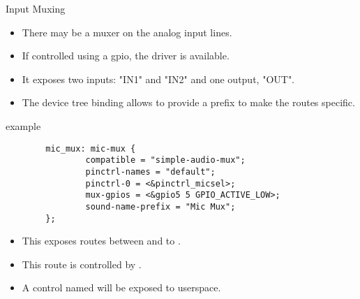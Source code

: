 \begin{frame}{Input Muxing}
  \begin{itemize}
  \item There may be a muxer on the analog input lines.
  \item If controlled using a gpio, the  driver is
    available.
  \item It exposes two inputs: "IN1" and "IN2" and one output, "OUT".
  \item The device tree binding allows to provide a prefix to make the
    routes specific.
  \end{itemize}
\end{frame}

\begin{frame}[fragile]{ example}
  \begin{block}{}
    \fontsize{8}{8}\selectfont
    \begin{verbatim}
        mic_mux: mic-mux {
                compatible = "simple-audio-mux";
                pinctrl-names = "default";
                pinctrl-0 = <&pinctrl_micsel>;
                mux-gpios = <&gpio5 5 GPIO_ACTIVE_LOW>;
                sound-name-prefix = "Mic Mux";
        };
    \end{verbatim}
  \end{block}
  \begin{itemize}
  \item This exposes routes between  and  to .
  \item This route is controlled by .
  \item A control named  will be exposed to
    userspace.
  \end{itemize}
\end{frame}

